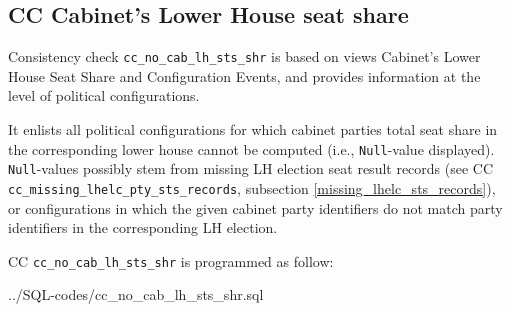 \subsection{CC Cabinet's Lower House seat share}\label{cc_no_cab_lh_sts_shr}
Consistency check \texttt{\footnotesize cc\_no\_cab\_lh\_sts\_shr} is based on views Cabinet's Lower House Seat Share and Configuration Events, and provides information at the level of political configurations. 

It enlists all political configurations for which cabinet parties total seat share in the corresponding lower house cannot be computed (i.e., \texttt{\footnotesize Null}-value displayed).
\texttt{\footnotesize Null}-values possibly stem from missing LH election seat result records (see CC \texttt{\footnotesize cc\_missing\_lhelc\_pty\_sts\_records}, subsection \ref{missing_lhelc_sts_records}), or configurations in which the given cabinet party identifiers do not match party identifiers in the corresponding LH election.

CC \texttt{\footnotesize cc\_no\_cab\_lh\_sts\_shr} is programmed as follow: 

%
{../SQL-codes/cc_no_cab_lh_sts_shr.sql}
